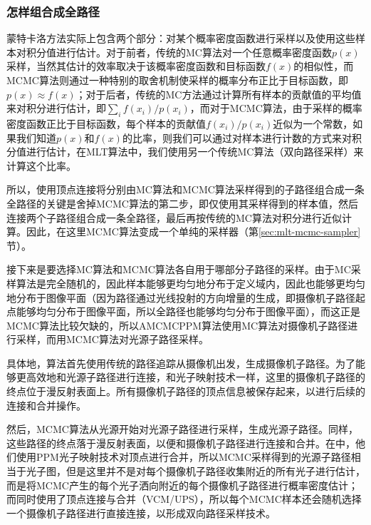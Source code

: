 \subsubsection{怎样组合成全路径}
蒙特卡洛方法实际上包含两个部分：对某个概率密度函数进行采样以及使用这些样本对积分值进行估计。对于前者，传统的MC算法对一个任意概率密度函数$p(x)$采样，当然其估计的效率取决于该概率密度函数和目标函数$f(x)$的相似性，而MCMC算法则通过一种特别的取舍机制使采样的概率分布正比于目标函数，即$p(x)\approx f(x)$；对于后者，传统的MC方法通过计算所有样本的贡献值的平均值来对积分进行估计，即$\sum_if(x_i)/p(x_i)$，而对于MCMC算法，由于采样的概率密度函数正比于目标函数，每个样本的贡献值$f(x_i)/p(x_i)$近似为一个常数，如果我们知道$p(x)$和$f(x)$的比率，则我们可以通过对样本进行计数的方式来对积分值进行估计，在MLT算法中，我们使用另一个传统MC算法（双向路径采样）来计算这个比率。

所以，使用顶点连接将分别由MC算法和MCMC算法采样得到的子路径组合成一条全路径的关键是舍掉MCMC算法的第二步，即仅使用其采样得到的样本值，然后连接两个子路径组合成一条全路径，最后再按传统的MC算法对积分进行近似计算。因此，在这里MCMC算法变成一个单纯的采样器（第\ref{sec:mlt-mcmc-sampler}节）。

接下来是要选择MC算法和MCMC算法各自用于哪部分子路径的采样。由于MC采样算法是完全随机的，因此样本能够更均匀地分布于定义域内，因此也能够更均匀地分布于图像平面（因为路径通过光线投射的方向增量的生成，即摄像机子路径起点能够均匀分布于图像平面，所以全路径也能够均匀分布于图像平面），而这正是MCMC算法比较欠缺的，所以AMCMCPPM算法使用MC算法对摄像机子路径进行采样，而用MCMC算法对光源子路径采样。

具体地，算法首先使用传统的路径追踪从摄像机出发，生成摄像机子路径。为了能够更高效地和光源子路径进行连接，和光子映射技术一样，这里的摄像机子路径的终点位于漫反射表面上。所有摄像机子路径的顶点信息被保存起来，以进行后续的连接和合并操作。

然后，MCMC算法从光源开始对光源子路径进行采样，生成光源子路径。同样，这些路径的终点落于漫反射表面，以便和摄像机子路径进行连接和合并。在\cite{a:RobustAdaptivePhotonTracingusingPhotonPathVisibility}中，他们使用PPM光子映射技术对顶点进行合并，所以MCMC采样得到的光源子路径相当于光子图，但是这里并不是对每个摄像机子路径收集附近的所有光子进行估计，而是将MCMC产生的每个光子洒向附近的每个摄像机子路径进行概率密度估计；而\cite{a:RobustLightTransportSimulationviaMetropolisedBidirectionalEstimators}同时使用了顶点连接与合并（VCM/UPS），所以每个MCMC样本还会随机选择一个摄像机子路径进行直接连接，以形成双向路径采样技术。





